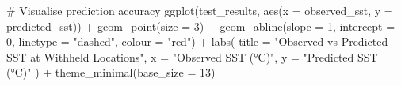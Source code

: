 \documentclass[
  11pt,
]{article}
\newenvironment{Shaded}{\begin{snugshade}}{\end{snugshade}}
\newcommand{\AttributeTok}[1]{\textcolor[rgb]{0.40,0.45,0.13}{#1}}
\newcommand{\CommentTok}[1]{\textcolor[rgb]{0.37,0.37,0.37}{#1}}
\newcommand{\DecValTok}[1]{\textcolor[rgb]{0.68,0.00,0.00}{#1}}
\newcommand{\FunctionTok}[1]{\textcolor[rgb]{0.28,0.35,0.67}{#1}}
\newcommand{\NormalTok}[1]{\textcolor[rgb]{0.00,0.23,0.31}{#1}}
\newcommand{\OtherTok}[1]{\textcolor[rgb]{0.00,0.23,0.31}{#1}}
\newcommand{\SpecialCharTok}[1]{\textcolor[rgb]{0.37,0.37,0.37}{#1}}
\newcommand{\StringTok}[1]{\textcolor[rgb]{0.13,0.47,0.30}{#1}}
\begin{document}
\begin{Shaded}
\end{Shaded}

\begin{Shaded}
\begin{Highlighting}[]
\CommentTok{\# Visualise prediction accuracy}
\FunctionTok{ggplot}\NormalTok{(test\_results, }\FunctionTok{aes}\NormalTok{(}\AttributeTok{x =}\NormalTok{ observed\_sst, }\AttributeTok{y =}\NormalTok{ predicted\_sst)) }\SpecialCharTok{+}
  \FunctionTok{geom\_point}\NormalTok{(}\AttributeTok{size =} \DecValTok{3}\NormalTok{) }\SpecialCharTok{+}
  \FunctionTok{geom\_abline}\NormalTok{(}\AttributeTok{slope =} \DecValTok{1}\NormalTok{, }\AttributeTok{intercept =} \DecValTok{0}\NormalTok{, }\AttributeTok{linetype =} \StringTok{"dashed"}\NormalTok{, }\AttributeTok{colour =} \StringTok{"red"}\NormalTok{) }\SpecialCharTok{+}
  \FunctionTok{labs}\NormalTok{(}
    \AttributeTok{title =} \StringTok{"Observed vs Predicted SST at Withheld Locations"}\NormalTok{,}
    \AttributeTok{x =} \StringTok{"Observed SST (°C)"}\NormalTok{,}
    \AttributeTok{y =} \StringTok{"Predicted SST (°C)"}
\NormalTok{  ) }\SpecialCharTok{+}
  \FunctionTok{theme\_minimal}\NormalTok{(}\AttributeTok{base\_size =} \DecValTok{13}\NormalTok{)}
\end{Highlighting}
\end{Shaded}
\end{document}
